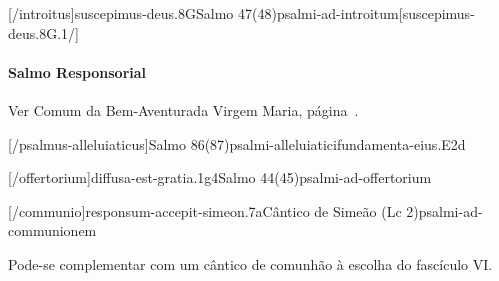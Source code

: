 \AllowPageFlush

[\Prefix/introitus]{suscepimus-deus.8G}{Salmo 47(48)}{psalmi-ad-introitum}[suscepimus-deus.8G.1/]

\paragraph{Salmo Responsorial}
\begin{rubrica}
  Ver Comum da Bem-Aventurada Virgem Maria, página~\pageref{subsection:communia/commune-bmv/psalmus-responsorius}.
\end{rubrica}


\AllowPageFlush

[\Prefix/psalmus-alleluiaticus]{Salmo 86(87)}{psalmi-alleluiatici}{fundamenta-eius.E2d}

\AllowPageFlush

[\Prefix/offertorium]{diffusa-est-gratia.1g4}{Salmo 44(45)}{psalmi-ad-offertorium}

\AllowPageFlush

[\Prefix/communio]{responsum-accepit-simeon.7a}{Cântico de Simeão (Lc 2)}{psalmi-ad-communionem}

\begin{rubrica}
  Pode-se complementar com um cântico de comunhão à escolha do fascículo VI.
\end{rubrica}

\AllowPageBreak